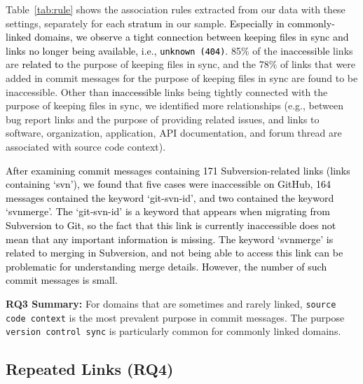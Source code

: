 \documentclass[smallextended]{svjour3}       %
\newcommand{\fix}[1]{\textcolor{black}{#1}}
\newcommand{\minor}[1]{\textcolor{black}{#1}}
\begin{document}
Table~\ref{tab:rule} shows the association rules extracted from our data
with these settings, separately for each \fix{stratum} in our sample. \minor{Especially in commonly-linked domains, we observe a tight connection between keeping files in sync and links no longer being available, i.e., \texttt{unknown (404)}}. 85\% of the \minor{inaccessible} links are \fix{related to} the purpose of keeping files in sync, and the 78\% of links that were added in commit messages for the purpose of keeping files in sync are found to be inaccessible. Other than \minor{inaccessible} links being tightly connected with the purpose of keeping files in sync, we identified more relationships (e.g., between bug report links and the purpose of providing related issues, and links to software, organization, application, API documentation, and forum thread are associated with source code context).

\fix{After examining commit messages containing 171 Subversion-related links (links containing `svn'), we found that five cases were inaccessible on GitHub, 164 messages contained the keyword `git-svn-id', and two contained the keyword `svnmerge'. The `git-svn-id' is a keyword that appears when migrating from Subversion to Git, so the fact that this link is currently inaccessible does not mean that any important information is missing. The keyword `svnmerge' is related to merging in Subversion, and not being able to access this link can be problematic for understanding merge details. However, the number of such commit messages is small.}





\begin{tcolorbox}
\textbf{RQ3 Summary:}
For domains that are sometimes and rarely linked, \texttt{source code context} is the most prevalent purpose in commit messages. The purpose \texttt{version control sync} is particularly common for commonly linked domains.
\end{tcolorbox}




\subsection{Repeated Links (RQ4)}
\end{document}
